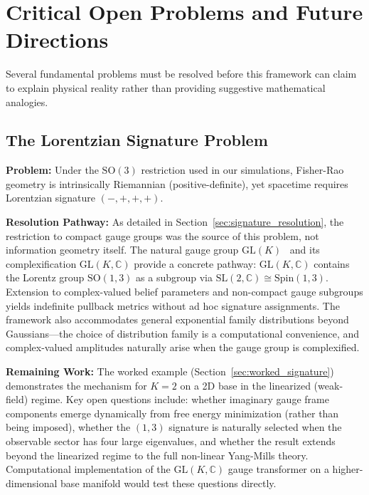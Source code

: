 \documentclass[11pt]{article}
\begin{document}
\section{Critical Open Problems and Future Directions}
\label{sec:open_problems}

Several fundamental problems must be resolved before this framework can claim to explain physical reality rather than providing suggestive mathematical analogies.

\subsection{The Lorentzian Signature Problem}

\textbf{Problem:} Under the $\mathrm{SO}(3)$ restriction used in our simulations, Fisher-Rao geometry is intrinsically Riemannian (positive-definite), yet spacetime requires Lorentzian signature $(-,+,+,+)$.

\textbf{Resolution Pathway:} As detailed in Section~\ref{sec:signature_resolution}, the restriction to compact gauge groups was the source of this problem, not information geometry itself. The natural gauge group $\mathrm{GL}(K)$~\cite{Dennis2026GL} and its complexification $\mathrm{GL}(K, \mathbb{C})$ provide a concrete pathway: $\mathrm{GL}(K, \mathbb{C})$ contains the Lorentz group $\mathrm{SO}(1,3)$ as a subgroup via $\mathrm{SL}(2, \mathbb{C}) \cong \mathrm{Spin}(1,3)$. Extension to complex-valued belief parameters and non-compact gauge subgroups yields indefinite pullback metrics without ad hoc signature assignments. The framework also accommodates general exponential family distributions beyond Gaussians---the choice of distribution family is a computational convenience, and complex-valued amplitudes naturally arise when the gauge group is complexified.

\textbf{Remaining Work:} The worked example (Section~\ref{sec:worked_signature}) demonstrates the mechanism for $K=2$ on a 2D base in the linearized (weak-field) regime. Key open questions include: whether imaginary gauge frame components emerge dynamically from free energy minimization (rather than being imposed), whether the $(1,3)$ signature is naturally selected when the observable sector has four large eigenvalues, and whether the result extends beyond the linearized regime to the full non-linear Yang-Mills theory. Computational implementation of the $\mathrm{GL}(K, \mathbb{C})$ gauge transformer on a higher-dimensional base manifold would test these questions directly.
\end{document}
